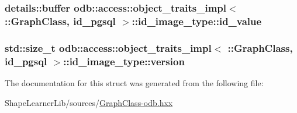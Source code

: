 \subsubsection[{id\+\_\+value}]{\setlength{\rightskip}{0pt plus 5cm}details\+::buffer odb\+::access\+::object\+\_\+traits\+\_\+impl$<$ \+::{\bf Graph\+Class}, id\+\_\+pgsql $>$\+::id\+\_\+image\+\_\+type\+::id\+\_\+value}\label{structodb_1_1access_1_1object__traits__impl_3_01_1_1_graph_class_00_01id__pgsql_01_4_1_1id__image__type_a602c482caa519136f50a5fd4ed6476db}
\hypertarget{structodb_1_1access_1_1object__traits__impl_3_01_1_1_graph_class_00_01id__pgsql_01_4_1_1id__image__type_ac06f8bba722a9971df8e8bc0ddf2059c}{}
\subsubsection[{version}]{\setlength{\rightskip}{0pt plus 5cm}std\+::size\+\_\+t odb\+::access\+::object\+\_\+traits\+\_\+impl$<$ \+::{\bf Graph\+Class}, id\+\_\+pgsql $>$\+::id\+\_\+image\+\_\+type\+::version}\label{structodb_1_1access_1_1object__traits__impl_3_01_1_1_graph_class_00_01id__pgsql_01_4_1_1id__image__type_ac06f8bba722a9971df8e8bc0ddf2059c}


The documentation for this struct was generated from the following file\+:\begin{DoxyCompactItemize}
\item 
Shape\+Learner\+Lib/sources/\hyperlink{_graph_class-odb_8hxx}{Graph\+Class-\/odb.\+hxx}\end{DoxyCompactItemize}
